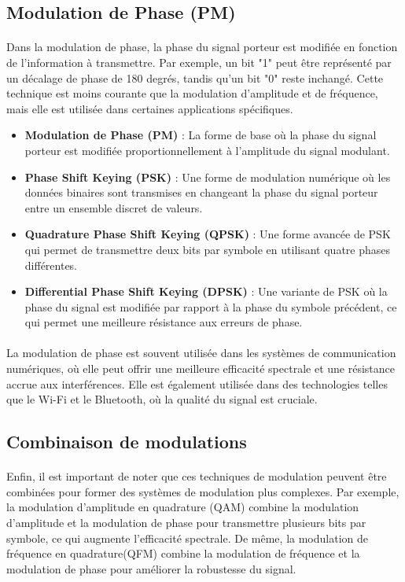 \documentclass[a4paper,twocolumn]{report}
\begin{document}
\subsection{Modulation de Phase (PM)}
\paragraph{}Dans la modulation de phase, la phase du signal porteur est modifiée
en fonction de l'information à transmettre.
Par exemple, un bit "1" peut être représenté par un décalage de phase de 180 degrés,
tandis qu'un bit "0" reste inchangé. Cette technique est moins courante que la modulation d'amplitude et de fréquence,
mais elle est utilisée dans certaines applications spécifiques.
\begin{itemize}
	\item \textbf{Modulation de Phase (PM)} :
    La forme de base où la phase du signal porteur est modifiée proportionnellement à l'amplitude du signal modulant.
	\item \textbf{Phase Shift Keying (PSK)} :
    Une forme de modulation numérique où les données binaires sont transmises en
    changeant la phase du signal porteur entre un ensemble discret de valeurs.
	\item \textbf{Quadrature Phase Shift Keying (QPSK)} :
    Une forme avancée de PSK qui permet de transmettre deux bits par symbole en utilisant quatre phases différentes.
	\item \textbf{Differential Phase Shift Keying (DPSK)} :
    Une variante de PSK où la phase du signal est modifiée par rapport à la phase du symbole précédent,
    ce qui permet une meilleure résistance aux erreurs de phase.
\end{itemize}
\paragraph{}La modulation de phase est souvent utilisée dans les systèmes de communication numériques,
où elle peut offrir une meilleure efficacité spectrale et une résistance accrue aux interférences.
Elle est également utilisée dans des technologies telles que le Wi-Fi et le Bluetooth,
où la qualité du signal est cruciale.

\subsection{Combinaison de modulations}
\paragraph{}Enfin, il est important de noter que ces techniques de modulation peuvent
être combinées pour former des systèmes de modulation plus complexes.
Par exemple, la modulation d'amplitude en quadrature (QAM) combine la modulation
d'amplitude et la modulation de phase pour transmettre plusieurs bits par symbole,
ce qui augmente l'efficacité spectrale. De même, la modulation de fréquence en quadrature(QFM)
combine la modulation de fréquence et la modulation de phase pour améliorer la robustesse du signal.
\end{document}
